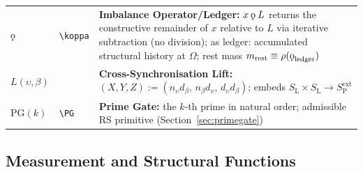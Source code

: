 \documentclass[11pt, letterpaper]{article}
\newcommand{\SL}{S_{\mathrm{L}}}
\newcommand{\SPe}{S_{\mathrm{P}}^{\mathrm{ext}}}
\newcommand{\rank}{\rho}
\newcommand{\koppa}{\mathbin{\text{\rm\k{o}}}}
\newcommand{\PG}{\mathrm{PG}}
\theoremstyle{definition}
\theoremstyle{plain}
\begin{document}
\begin{longtable}{L{2.0cm} L{2.6cm} L{8.5cm}}
$\koppa$ & \verb|\koppa| & \textbf{Imbalance Operator/Ledger:}
  $x\koppa L$ returns the constructive remainder of $x$ relative to $L$
  via iterative subtraction (no division); as ledger: accumulated structural
  history at $\Omega$; rest mass $m_{\mathrm{rest}}\equiv\rank(\koppa_{\mathrm{ledger}})$
  \\[3pt]

$L(\upsilon,\beta)$ & & \textbf{Cross-Synchronisation Lift:}
  $(X,Y,Z):=(n_\upsilon d_\beta,\,n_\beta d_\upsilon,\,d_\upsilon d_\beta)$;
  embeds $\SL\times\SL\to\SPe$ \\[3pt]

$\PG(k)$ & \verb|\PG| & \textbf{Prime Gate:}
  the $k$-th prime in natural order; admissible RS primitive
  (Section~\ref{sec:primegate}) \\[3pt]
\end{longtable}

\subsection{Measurement and Structural Functions}
\end{document}
